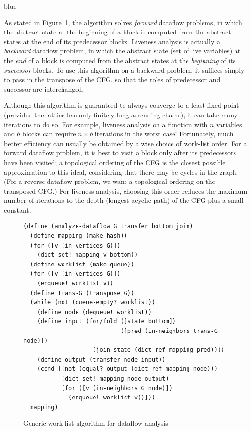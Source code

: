\documentclass[11pt]{book}
\newenvironment{ocamlx}{
  \begin{color}{blue}
}
{
  \end{color}
}
\begin{document}
\begin{ocamlx}
  As stated in Figure~\ref{fig:generic-dataflow}, the algorithm solves \emph{forward} dataflow problems,
  in which the abstract state at the beginning of a block is computed from
  the abstract states at the end of its predecessor blocks.  Liveness
  analysis is actually a \emph{backward} dataflow problem, in which the
  abstract state (set of live variables) at the \emph{end} of a block
  is computed from the abstract states at the \emph{beginning} of its
  \emph{successor} blocks.  To use this algorithm on a backward problem,
  it suffices simply to pass in the transpose of the CFG, so that
  the roles of predecessor and successor are interchanged.

  Although this algorithm is guaranteed to always converge to a least fixed
  point (provided the lattice has only finitely-long ascending chains), it
  can take many iterations to do so. For example, liveness analysis on a
  function with $n$ variables and $b$ blocks can require $n\times b$ iterations
  in the worst case! Fortunately, much better efficiency can usually be obtained
  by a wise choice of work-list order. For a forward dataflow problem, it is
  best to visit a block only after its predecessors have been visited;
  a topological ordering of the CFG is the closest possible approximation
  to this ideal, considering that there may be cycles in the graph.
  (For a reverse dataflow problem, we want a topological ordering on the
  transposed CFG.)  For liveness analysis, choosing this order reduces
  the maximum number of iterations to the depth (longest acyclic path) of
  the CFG plus a small constant.
\end{ocamlx}

\begin{figure}[tb]
\begin{lstlisting}
(define (analyze-dataflow G transfer bottom join)
  (define mapping (make-hash))
  (for ([v (in-vertices G)])
    (dict-set! mapping v bottom))
  (define worklist (make-queue))
  (for ([v (in-vertices G)])
    (enqueue! worklist v))
  (define trans-G (transpose G))
  (while (not (queue-empty? worklist))
    (define node (dequeue! worklist)) 
    (define input (for/fold ([state bottom])
                            ([pred (in-neighbors trans-G node)])
                    (join state (dict-ref mapping pred))))
    (define output (transfer node input))
    (cond [(not (equal? output (dict-ref mapping node)))
           (dict-set! mapping node output)
           (for ([v (in-neighbors G node)])
             (enqueue! worklist v))]))
  mapping)
\end{lstlisting}
\caption{Generic work list algorithm for dataflow analysis}
  \label{fig:generic-dataflow}
\end{figure}
\end{document}
